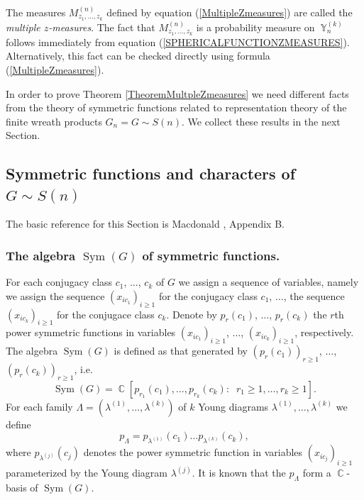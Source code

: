 \documentclass[12pt]{amsart}
\theoremstyle{definition}
\numberwithin{equation}{section}
\DeclareMathOperator{\Y}{\mathbb{Y}}
\DeclareMathOperator{\C}{\mathbb{C}}
\DeclareMathOperator{\Sym}{Sym}
\begin{document}
The measures $M^{(n)}_{z_1,\ldots,z_k}$ defined by equation (\ref{MultipleZmeasures}) are called the \textit{multiple $z$-measures}.
The fact that $M^{(n)}_{z_1,\ldots,z_k}$ is a probability measure on $\Y_n^{(k)}$ follows immediately from equation (\ref{SPHERICALFUNCTIONZMEASURES}). Alternatively, this fact can be checked directly using formula (\ref{MultipleZmeasures}).








In order to prove Theorem \ref{TheoremMultpleZmeasures} we need different facts from the theory of symmetric functions related to
representation theory of the finite wreath products $G_n=G\sim S(n)$. We collect these
results in the next Section.
\subsection{Symmetric functions and  characters of $G\sim S(n)$}
The basic reference for this Section is Macdonald \cite{Macdonald}, Appendix B.
\subsubsection{The algebra $\Sym\left(G\right)$ of  symmetric functions.}\label{SectionAlgebraSymmetricFunctions}
For each conjugacy class $c_1$, $\ldots$, $c_k$ of $G$ we assign a sequence of variables, namely we assign
the sequence $\left(x_{ic_1}\right)_{i\geq 1}$ for the conjugacy class $c_1$, $\ldots$, the sequence $\left(x_{ic_k}\right)_{i\geq 1}$ for the conjugace class $c_k$.
Denote by $p_r(c_1)$, $\ldots$, $p_r(c_k)$ the $r$th power symmetric functions in variables
$\left(x_{ic_1}\right)_{i\geq 1}$, $\ldots$, $\left(x_{ic_k}\right)_{i\geq 1}$, respectively. The algebra $\Sym\left(G\right)$ is defined as that generated by
$\left(p_r(c_1)\right)_{r\geq 1}$, $\ldots$, $\left(p_r(c_k)\right)_{r\geq 1}$, i.e.
$$
\Sym\left(G\right)=\C\left[p_{r_1}(c_1),\ldots,p_{r_k}(c_k):\;\; r_1\geq 1,\ldots, r_k\geq 1\right].
$$
For each family $\Lambda=\left(\lambda^{(1)},\ldots,\lambda^{(k)}\right)$ of $k$ Young diagrams
$\lambda^{(1)},\ldots,\lambda^{(k)}$ we define
$$
p_{\Lambda}=p_{\lambda^{(1)}}\left(c_1\right)\ldots p_{\lambda^{(k)}}\left(c_k\right),
$$
where $p_{\lambda^{(j)}}\left(c_j\right)$ denotes the power symmetric function in variables
$\left(x_{ic_j}\right)_{i\geq 1}$ parameterized by the Young diagram $\lambda^{(j)}$.
It is known that the $p_{\Lambda}$ form a $\C$-basis of $\Sym(G)$.
\end{document}
